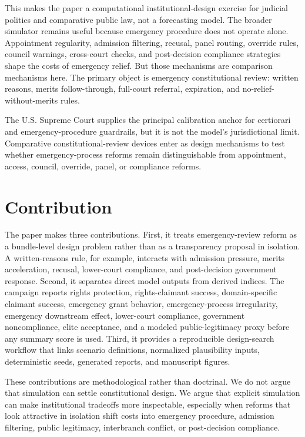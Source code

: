 \documentclass[
    journal=jlc,
    manuscript=research-article,
    year=2026,
  ]{cup-journal}
\begin{document}
This makes the paper a computational institutional-design exercise for judicial politics and comparative public law, not a forecasting model. The broader simulator remains useful because emergency procedure does not operate alone. Appointment regularity, admission filtering, recusal, panel routing, override rules, council warnings, cross-court checks, and post-decision compliance strategies shape the costs of emergency relief. But those mechanisms are comparison mechanisms here. The primary object is emergency constitutional review: written reasons, merits follow-through, full-court referral, expiration, and no-relief-without-merits rules.

The U.S. Supreme Court supplies the principal calibration anchor for certiorari and emergency-procedure guardrails, but it is not the model's jurisdictional limit. Comparative constitutional-review devices enter as design mechanisms to test whether emergency-process reforms remain distinguishable from appointment, access, council, override, panel, or compliance reforms.

\section{Contribution}

The paper makes three contributions. First, it treats emergency-review reform as a bundle-level design problem rather than as a transparency proposal in isolation. A written-reasons rule, for example, interacts with admission pressure, merits acceleration, recusal, lower-court compliance, and post-decision government response. Second, it separates direct model outputs from derived indices. The campaign reports rights protection, rights-claimant success, domain-specific claimant success, emergency grant behavior, emergency-process irregularity, emergency downstream effect, lower-court compliance, government noncompliance, elite acceptance, and a modeled public-legitimacy proxy before any summary score is used. Third, it provides a reproducible design-search workflow that links scenario definitions, normalized plausibility inputs, deterministic seeds, generated reports, and manuscript figures.

These contributions are methodological rather than doctrinal. We do not argue that simulation can settle constitutional design. We argue that explicit simulation can make institutional tradeoffs more inspectable, especially when reforms that look attractive in isolation shift costs into emergency procedure, admission filtering, public legitimacy, interbranch conflict, or post-decision compliance.
\end{document}
